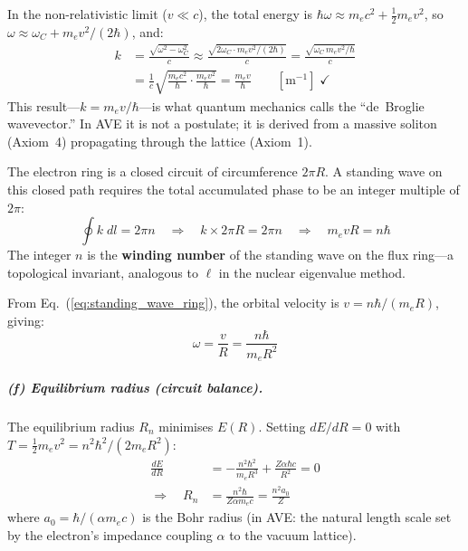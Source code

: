 In the non-relativistic limit ($v \ll c$), the total
energy is $\hbar\omega \approx m_e c^2 + \tfrac{1}{2}m_e v^2$,
so $\omega \approx \omega_C + m_e v^2/(2\hbar)$, and:
\begin{align}
    k &= \frac{\sqrt{\omega^2 - \omega_C^2}}{c}
    \approx \frac{\sqrt{2\omega_C \cdot m_e v^2/(2\hbar)}}{c}
    = \frac{\sqrt{\omega_C\, m_e v^2 / \hbar}}{c}
    \nonumber \\
    &= \frac{1}{c}
    \sqrt{\frac{m_e c^2}{\hbar} \cdot \frac{m_e v^2}{\hbar}}
    = \frac{m_e v}{\hbar}
    \qquad [\text{m}^{-1}]\;\checkmark
    \label{eq:k_soliton}
\end{align}
This result---$k = m_e v / \hbar$---is what quantum mechanics
calls the ``de~Broglie wavevector.''  In AVE it is not
a postulate; it is derived from a massive soliton
(Axiom~4) propagating through the lattice (Axiom~1).

The electron ring is a closed circuit of circumference $2\pi R$.
A standing wave on this closed path requires the total
accumulated phase to be an integer multiple of $2\pi$:
\begin{equation}
    \oint k\;dl = 2\pi n
    \quad\Longrightarrow\quad
    k \times 2\pi R = 2\pi n
    \quad\Longrightarrow\quad
    m_e v R = n\hbar
    \label{eq:standing_wave_ring}
\end{equation}
The integer $n$ is the \textbf{winding number} of the
standing wave on the flux ring---a topological invariant,
analogous to $\ell$ in the nuclear eigenvalue method.

From Eq.~(\ref{eq:standing_wave_ring}), the orbital velocity
is $v = n\hbar/(m_e R)$, giving:
\begin{equation}
    \omega = \frac{v}{R} = \frac{n\hbar}{m_e R^2}
    \label{eq:omega_from_n}
\end{equation}

\subparagraph{(f) Equilibrium radius (circuit balance).}
The equilibrium radius $R_n$ minimises $E(R)$.  Setting
$dE/dR = 0$ with $T = \tfrac{1}{2}m_e v^2 = n^2\hbar^2/(2m_e R^2)$:
\begin{align}
    \frac{dE}{dR}
    &= -\frac{n^2\hbar^2}{m_e R^3}
    + \frac{Z\alpha\hbar c}{R^2} = 0
    \nonumber \\
    \Longrightarrow\quad
    R_n &= \frac{n^2 \hbar}{Z \alpha m_e c}
    = \frac{n^2 a_0}{Z}
    \label{eq:R_equilibrium}
\end{align}
where $a_0 = \hbar/(\alpha m_e c)$ is the Bohr radius
(in AVE: the natural length scale set by the electron's
impedance coupling $\alpha$ to the vacuum lattice).

